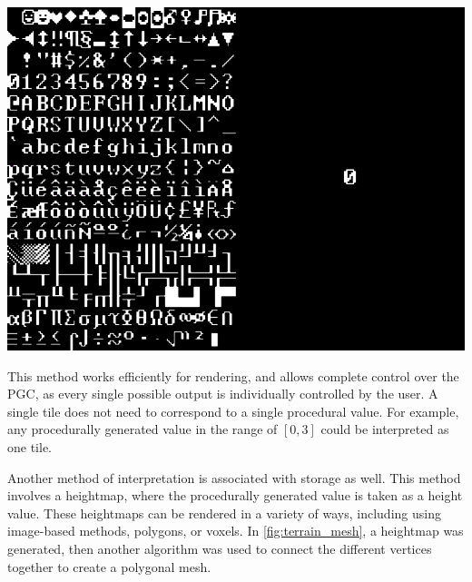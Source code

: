 \documentclass[10pt]{report}
\begin{document}
		\begin{minipage}{\textwidth}
			\centering
			\includegraphics[scale=0.3]{Curses_1920x900}
			\label{fig:Curses_1920x900}
		\end{minipage}
	
		This method works efficiently for rendering, and allows complete control over the PGC, as every single possible output is individually controlled by the user. A single tile does not need to correspond to a single procedural value. For example, any procedurally generated value in the range of \([0,3]\) could be interpreted as one tile. 
		
		Another method of interpretation is associated with storage as well. This method involves a heightmap, where the procedurally generated value is taken as a height value. These heightmaps can be rendered in a variety of ways, including using image-based methods, polygons, or voxels. In \autoref{fig:terrain_mesh}, a heightmap was generated, then another algorithm was used to connect the different vertices together to create a polygonal mesh. 
		
\end{document}

